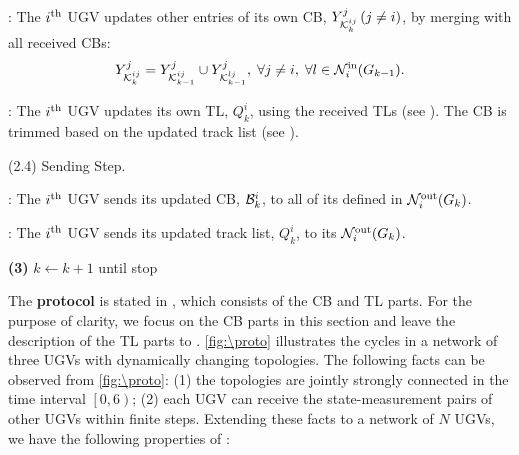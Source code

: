 \begin{algorithm}
\begin{algorithmic}
			\CB: The $i^\text{th}$ UGV updates other entries of its own CB, $Y^j_{\mathcal{K}^{ij}_{k}}\,(j\neq i)$, by merging with all received CBs:						
			\small\begin{equation*}
			Y^j_{\mathcal{K}^{ij}_{k}} = Y^j_{\mathcal{K}^{ij}_{k-1}} \cup Y^j_{\mathcal{K}^{lj}_{k-1}},
			\; \forall j\neq i,\;\forall l\in \mathcal{N}^\text{in}_i(G_{k-1}).
			\end{equation*}\normalsize
			
			\TL: The $i^\text{th}$ UGV updates its own TL, $Q^i_k$, using the received TLs (see ).
			\textcolor{\revcol}{The CB is trimmed based on the updated track list (see )}. 
			
			\State (2.4) Sending Step.
			
			\CB: The $i^\text{th}$ UGV sends its updated CB, \small$\mathcal{B}^i_k$\normalsize, 
			to all of its {\onbhd} defined in $\mathcal{N}^\text{out}_i(G_k)$.
			
			\TL: The $i^\text{th}$ UGV sends its updated track list, $Q^i_k$, to its {\onbhd} $\mathcal{N}^\text{out}_i(G_k)$.
			
			\State \textbf{(3)} $k\leftarrow k+1$ until stop
		\end{algorithmic}
	\end{algorithm}
	
	The \textbf{{\proto} protocol} is stated in ,
	\textcolor{\revcol}{which consists of the CB and TL parts. For the purpose of clarity, we focus on the CB parts in this section and leave the description of the TL parts to .}		
	\cref{fig:\proto} illustrates the {\proto} cycles in a network of three UGVs with dynamically changing topologies.
	The following facts can be observed from \cref{fig:\proto}: 
	(1) the topologies are jointly strongly connected in the time interval $\left[0,6\right)$;
	(2) each UGV can receive the state-measurement pairs of other UGVs within finite steps.
	Extending these facts to a network of $N$ UGVs, we have the following properties of \proto:
	
